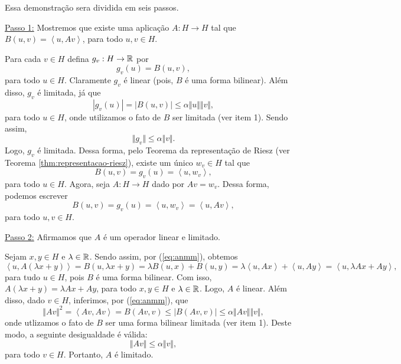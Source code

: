 \begin{prf}
    Essa demonstração sera dividida em seis passos.

    \underline{Passo 1:} Mostremos que existe uma aplicação $A : H \to H$ tal que $B(u,v) = \left\langle u, Av \right\rangle$, para todo $u,v \in H$.

    Para cada $v \in H$ defina $g_v : H \to \mathbb{R}$ por
    \[
        g_v(u) = B(u,v),
    \]
    para todo $u \in H$.
    Claramente $g_v$ é linear (pois, $B$ é uma forma bilinear).
    Além disso, $g_v$ é limitada, já que
    \[
        |g_v(u)| = |B(u,v)| \leqslant \alpha \Vert u \Vert \Vert v \Vert,
    \]
    para todo $u \in H$, onde utilizamos o fato de $B$ ser limitada (ver item 1).
    Sendo assim,
    \[
        \Vert g_v \Vert \leqslant \alpha \Vert v \Vert.
    \]
    Logo, $g_v$ é limitada.
    Dessa forma, pelo Teorema da representação de Riesz (ver Teorema \ref{thm:representacao-riesz}), existe um único $w_v \in H$ tal que
    \[
        B(u,v) = g_v(u) = \left\langle u, w_v \right\rangle,
    \]
    para todo $u \in H$.
    Agora, seja $A : H \to H$ dado por $Av = w_v$.
    Dessa forma, podemos escrever
    \begin{equation} \label{eq:anmm}
        B(u,v) = g_v(u) = \left\langle u,w_v \right\rangle = \left\langle u, Av \right\rangle,
    \end{equation}
    para todo $u,v \in H$.

    \underline{Passo 2:} Afirmamos que $A$ é um operador linear e limitado.

    Sejam $x, y \in H$ e $\lambda \in \mathbb{R}$.
    Sendo assim, por (\ref{eq:anmm}), obtemos
    \[
        \left\langle u, A(\lambda x + y) \right\rangle = B(u, \lambda x + y) = \lambda B(u,x) + B(u,y) = \lambda \left\langle u, Ax \right\rangle + \left\langle u, Ay \right\rangle = \left\langle u, \lambda Ax + Ay \right\rangle,
    \]
    para tudo $u \in H$,
    pois $B$ é uma forma bilinear.
    Com isso, $A(\lambda x + y) = \lambda Ax + Ay$, para todo $x,y \in H$ e $\lambda \in \mathbb{R}$.
    Logo, $A$ é linear.
    Além disso, dado $v \in H$, inferimos, por (\ref{eq:anmm}), que
    \[
        \Vert Av \Vert^2 = \left\langle Av, Av \right\rangle = B(Av, v) \leqslant |B(Av, v)| \leqslant \alpha \Vert Av \Vert \Vert v \Vert,
    \]
    onde utlizamos o fato de $B$ ser uma forma bilinear limitada (ver item 1). Deste modo, a seguinte desigualdade é válida:
    \[
        \Vert Av \Vert \leqslant \alpha \Vert v \Vert,
    \]
    para todo $v \in H$.
    Portanto, $A$ é limitado.


\end{prf}
